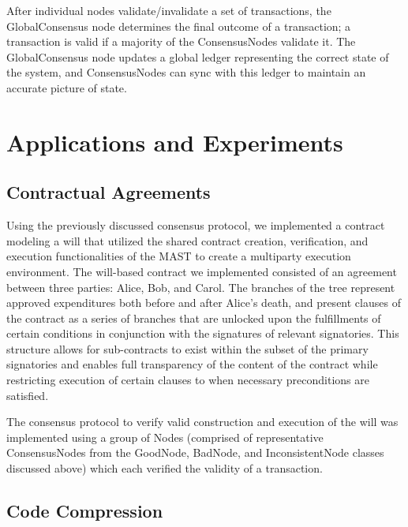 \documentclass{vldb}
\begin{document}
After individual nodes validate/invalidate a set of transactions, the GlobalConsensus node determines the final outcome of a transaction; a transaction is valid if a majority of the ConsensusNodes validate it. The GlobalConsensus node updates a global ledger representing the correct state of the system, and ConsensusNodes can sync with this ledger to maintain an accurate picture of state.

\section{Applications and Experiments}

\subsection{Contractual Agreements}

Using the previously discussed consensus protocol, we implemented a contract modeling a will that utilized the shared contract creation, verification, and execution functionalities of the MAST to create a multiparty execution environment. The will-based contract we implemented consisted of an agreement between three parties: Alice, Bob, and Carol. The branches of the tree represent approved expenditures both before and after Alice’s death, and present clauses of the contract as a series of branches that are unlocked upon the fulfillments of certain conditions in conjunction with the signatures of relevant signatories. This structure allows for sub-contracts to exist within the subset of the primary signatories and enables full transparency of the content of the contract while restricting execution of certain clauses to when necessary preconditions are satisfied.

The consensus protocol to verify valid construction and execution of the will was implemented using a group of Nodes (comprised of representative ConsensusNodes from the GoodNode, BadNode, and InconsistentNode classes discussed above) which each verified the validity of a transaction.

\subsection{Code Compression}
\end{document}

